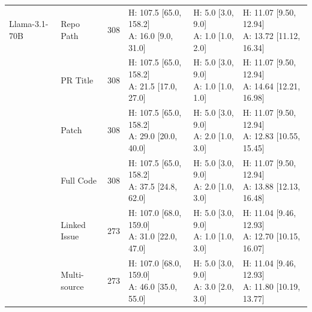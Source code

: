 \begin{table}[tp]
\begin{tabular}{llrlll}
\midrule
Llama-3.1-70B & Repo Path & 308 & \shortstack[l]{H: 107.5 [65.0, 158.2]\\A: 16.0 [9.0, 31.0]} & \shortstack[l]{H: 5.0 [3.0, 9.0]\\A: 1.0 [1.0, 2.0]} & \shortstack[l]{H: 11.07 [9.50, 12.94]\\A: 13.72 [11.12, 16.34]} \\
 & PR Title & 308 & \shortstack[l]{H: 107.5 [65.0, 158.2]\\A: 21.5 [17.0, 27.0]} & \shortstack[l]{H: 5.0 [3.0, 9.0]\\A: 1.0 [1.0, 1.0]} & \shortstack[l]{H: 11.07 [9.50, 12.94]\\A: 14.64 [12.21, 16.98]} \\
 & Patch & 308 & \shortstack[l]{H: 107.5 [65.0, 158.2]\\A: 29.0 [20.0, 40.0]} & \shortstack[l]{H: 5.0 [3.0, 9.0]\\A: 2.0 [1.0, 3.0]} & \shortstack[l]{H: 11.07 [9.50, 12.94]\\A: 12.83 [10.55, 15.45]} \\
 & Full Code & 308 & \shortstack[l]{H: 107.5 [65.0, 158.2]\\A: 37.5 [24.8, 62.0]} & \shortstack[l]{H: 5.0 [3.0, 9.0]\\A: 2.0 [1.0, 3.0]} & \shortstack[l]{H: 11.07 [9.50, 12.94]\\A: 13.88 [12.13, 16.48]} \\
 & Linked Issue & 273 & \shortstack[l]{H: 107.0 [68.0, 159.0]\\A: 31.0 [22.0, 47.0]} & \shortstack[l]{H: 5.0 [3.0, 9.0]\\A: 1.0 [1.0, 3.0]} & \shortstack[l]{H: 11.04 [9.46, 12.93]\\A: 12.70 [10.15, 16.07]} \\
 & Multi-source & 273 & \shortstack[l]{H: 107.0 [68.0, 159.0]\\A: 46.0 [35.0, 55.0]} & \shortstack[l]{H: 5.0 [3.0, 9.0]\\A: 3.0 [2.0, 3.0]} & \shortstack[l]{H: 11.04 [9.46, 12.93]\\A: 11.80 [10.19, 13.77]} \\
\bottomrule
\end{tabular}
\end{table}
